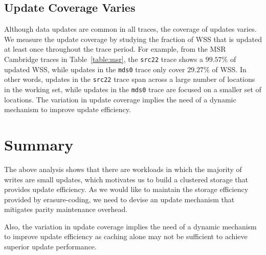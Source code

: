 \subsection{Update Coverage Varies} Although data updates are common in all
traces, the coverage of updates varies. %
We measure the update coverage by studying the fraction of WSS that is updated
at least once throughout the trace period. For example, from the MSR Cambridge
traces in Table~\ref{table:msr}, the \texttt{src22} trace shows a $99.57\%$ of
updated WSS, while updates in the \texttt{mds0} trace only cover $29.27\%$ of
WSS. In other words, updates in the \texttt{src22} trace span across a large
number of locations in the working set, while updates in the \texttt{mds0}
trace are focused on a smaller set of locations.  The variation in update
coverage implies the need of a dynamic mechanism to improve update efficiency.


\section{Summary} 

The above analysis shows that there are workloads in which the majority of
writes are small updates, which motivates us to build a clustered storage that
provides update efficiency. As we would like to maintain the storage efficiency
provided by erasure-coding, we need to devise an update mechanism that mitigates
parity maintenance overhead. 

Also, the variation in update coverage implies the need of a dynamic mechanism
to improve update efficiency as caching alone may not be sufficient to achieve
superior update performance. 

